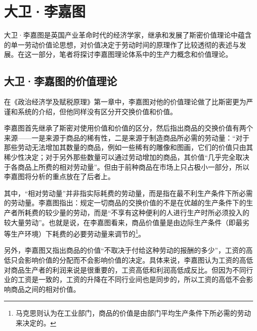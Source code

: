 \section{大卫·李嘉图}

大卫·李嘉图是英国产业革命时代的经济学家，继承和发展了斯密价值理论中蕴含的单一劳动价值论思想，对价值决定于劳动时间的原理作了比较透彻的表述与发展\cite[iv]{DaWei*LiJiaTuZhengZhiJingJiXueJiFuShuiYuanLi2021}。在这一部分，笔者将探讨李嘉图理论体系中的生产力概念和价值理论。

\subsection{大卫·李嘉图的价值理论}

在《政治经济学及赋税原理》第一章中，李嘉图对他的价值理论做了比斯密更为严谨和系统的介绍，但他同样没有区分开交换价值和价值。

李嘉图首先继承了斯密对使用价值和价值的区分，然后指出商品的交换价值有两个来源——一是来源于商品的稀有性，二是来源于制造商品所必需的劳动量\cite[5-6]{DaWei*LiJiaTuZhengZhiJingJiXueJiFuShuiYuanLi2021}：“对于那些劳动无法增加其数量的商品，例如一些稀有的雕像和图画，它们的价值只由其稀少性决定；对于另外那些数量可以通过劳动增加的商品，其价值“几乎完全取决于各商品上所费的相对劳动量”。\cite[6]{DaWei*LiJiaTuZhengZhiJingJiXueJiFuShuiYuanLi2021}但由于前种商品在市场上只占极小一部分，所以李嘉图将分析的重点放在了后者上。

其中，“相对劳动量”并非指实际耗费的劳动量，而是指在最不利生产条件下所必需的劳动量\cite[16]{LiRenJunJieZhiLiLun2004}。李嘉图指出：规定一切商品的交换价值的不是在优越的生产条件下的生产者所耗费的较少量的劳动，而是“不享有这种便利的人进行生产时所必须投入的较大量劳动”\cite[58]{DaWei*LiJiaTuZhengZhiJingJiXueJiFuShuiYuanLi2021}。也就是说，在李嘉图看来，商品价值量是由边际生产条件（即最劣等生产环境）下耗费的必要劳动量来调节的\cite[9]{ChenZhenYuLunSheHuiBiYaoLaoDongShiJianXueShuoCongGuDianXuePaiDaoMaKeSiDeFaZhan1990}\footnote{马克思则认为在工业部门，商品的价值是由部门平均生产条件下所必需的劳动来决定的\cite[16]{LiRenJunJieZhiLiLun2004}。}。

另外，李嘉图又指出商品的价值“不取决于付给这种劳动的报酬的多少”\cite[5]{DaWei*LiJiaTuZhengZhiJingJiXueJiFuShuiYuanLi2021}，工资的高低只会影响价值的分配而不会影响价值的决定。具体来说，李嘉图认为工资的高低对商品生产者的利润来说是很重要的，工资高低和利润高低成反比。但因为不同行业的工资是一致的，工资的升降在不同行业间也是同步的，所以工资的高低不会影响商品之间的相对价值\cite[19]{DaWei*LiJiaTuZhengZhiJingJiXueJiFuShuiYuanLi2021}。

